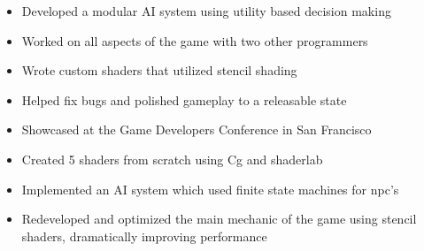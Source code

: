 \documentclass[10pt,a4paper]{altacv}
\begin{document}

\begin{itemize}
	\item Developed a modular AI system using utility based decision making
	\item Worked on all aspects of the game with two other programmers
	\item Wrote custom shaders that utilized stencil shading
	\item Helped fix bugs and polished gameplay to a releasable state
	\item Showcased at the Game Developers Conference in San Francisco
\end{itemize}

\divider

\begin{itemize}
	\item Created 5 shaders from scratch using Cg and shaderlab
	\item Implemented an AI system which used finite state machines for npc's
	\item Redeveloped and optimized the main mechanic of the game using stencil shaders, dramatically improving performance
\end{itemize}



\nocite{*}








\end{document}
